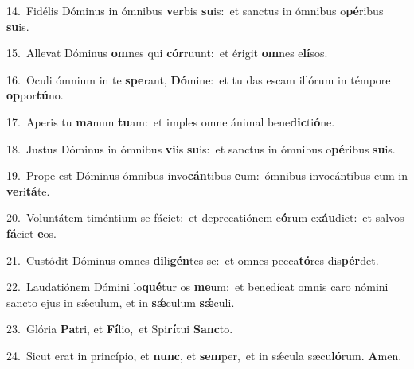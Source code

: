 {\numbfont\textcolor{\numbcolor}{14.}}~Fidélis Dóminus in ómnibus \textbf{ver}\-bis \textbf{su}\-is:~\star et sanctus in ómnibus o\-\textbf{pé}\-ribus \textbf{su}\-is.\par
{\numbfont\textcolor{\numbcolor}{15.}}~Allevat Dóminus \textbf{om}\-nes qui \textbf{cór}\-ruunt:~\star et érigit \textbf{om}\-nes e\-\textbf{lí}\-sos.\par
{\numbfont\textcolor{\numbcolor}{16.}}~Oculi ómnium in te \textbf{spe}\-rant, \textbf{Dó}\-mine:~\star et tu das escam illórum in témpore \textbf{op}\-por\-\textbf{tú}\-no.\par
{\numbfont\textcolor{\numbcolor}{17.}}~Aperis tu \textbf{ma}\-num \textbf{tu}\-am:~\star et imples omne ánimal bene\-\textbf{dic}\-ti\-\textbf{ó}\-ne.\par
{\numbfont\textcolor{\numbcolor}{18.}}~Justus Dóminus in ómnibus \textbf{vi}\-is \textbf{su}\-is:~\star et sanctus in ómnibus o\-\textbf{pé}\-ribus \textbf{su}\-is.\par
{\numbfont\textcolor{\numbcolor}{19.}}~Prope est Dóminus ómnibus invo\-\textbf{cán}\-tibus \textbf{e}\-um:~\star ómnibus invocántibus eum in \textbf{ve}\-ri\-\textbf{tá}\-te.\par
{\numbfont\textcolor{\numbcolor}{20.}}~Voluntátem timéntium se fáciet:~\dagger et deprecatiónem e\-\textbf{ó}\-rum ex\-\textbf{áu}\-diet:~\star et salvos \textbf{fá}\-ciet \textbf{e}\-os.\par
{\numbfont\textcolor{\numbcolor}{21.}}~Custódit Dóminus omnes \textbf{di}\-li\-\textbf{gén}\-tes se:~\star et omnes pecca\-\textbf{tó}\-res dis\-\textbf{pér}\-det.\par
{\numbfont\textcolor{\numbcolor}{22.}}~Laudatiónem Dómini lo\-\textbf{qué}\-tur os \textbf{me}\-um:~\star et benedícat omnis caro nómini sancto ejus in sǽculum, et in \textbf{sǽ}\-culum \textbf{sǽ}\-culi.\par
{\numbfont\textcolor{\numbcolor}{23.}}~Glória \textbf{Pa}\-tri, et \textbf{Fí}\-lio,~\star et Spi\-\textbf{rí}\-tui \textbf{Sanc}\-to.\par
{\numbfont\textcolor{\numbcolor}{24.}}~Sicut erat in princípio, et \textbf{nunc}\-, et \textbf{sem}\-per,~\star et in sǽcula sæcu\-\textbf{ló}\-rum. \textbf{A}\-men.\par
